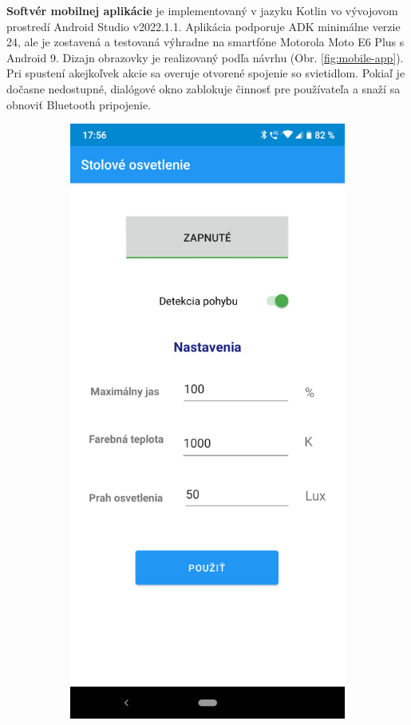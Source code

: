 \documentclass[12pt, a4paper]{article}
\begin{document}
\textbf{Softvér mobilnej aplikácie} je implementovaný v jazyku Kotlin vo vývojovom prostredí Android Studio v2022.1.1. Aplikácia podporuje ADK minimálne verzie 24, ale je zostavená a testovaná výhradne na smartfóne Motorola Moto E6 Plus s Android 9. Dizajn obrazovky je realizovaný podľa návrhu (Obr. \ref{fig:mobile-app}). Pri spustení akejkoľvek akcie sa overuje otvorené spojenie so svietidlom. Pokiaľ je dočasne nedostupné, dialógové okno zablokuje činnosť pre používateľa a snaží sa obnoviť Bluetooth pripojenie.

\begin{figure}[h]
\centering
\begin{subfigure}[b]{0.45\textwidth}
	\centering
	\includegraphics[width=\textwidth]{assets/mobile-app.png}

\end{subfigure}
\end{figure}
\end{document}
